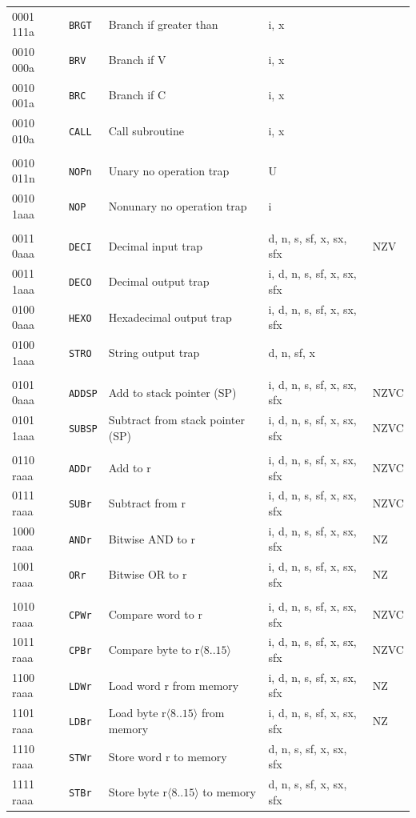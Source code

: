 \documentclass[10pt,fleqn]{book}
\begin{document}
\begin{tabular}{ l l l l l }
0001 111a   & \verb|BRGT|    & Branch if greater than               & i, x \\ 
0010 000a   & \verb|BRV|     & Branch if V                          & i, x \\ 
0010 001a   & \verb|BRC|     & Branch if C                          & i, x \\ 
0010 010a   & \verb|CALL|    & Call subroutine                      & i, x \\ 
 \\
0010 011n   & \verb|NOPn|    & Unary no operation trap              & U \\
0010 1aaa   & \verb|NOP|     & Nonunary no operation trap           & i \\
 \\
0011 0aaa   & \verb|DECI|    & Decimal input trap                   & d, n, s, sf, x, sx, sfx    & NZV \\
0011 1aaa   & \verb|DECO|    & Decimal output trap                  & i, d, n, s, sf, x, sx, sfx \\
0100 0aaa   & \verb|HEXO|    & Hexadecimal output trap              & i, d, n, s, sf, x, sx, sfx \\
0100 1aaa   & \verb|STRO|    & String output trap                   & d, n, sf, x \\
 \\
0101 0aaa   & \verb|ADDSP|   & Add to stack pointer (SP)            & i, d, n, s, sf, x, sx, sfx  & NZVC \\
0101 1aaa   & \verb|SUBSP|   & Subtract from stack pointer (SP)     & i, d, n, s, sf, x, sx, sfx  & NZVC \\
 \\
0110 raaa   & \verb|ADDr|    & Add to r                             & i, d, n, s, sf, x, sx, sfx  & NZVC \\
0111 raaa   & \verb|SUBr|    & Subtract from r                      & i, d, n, s, sf, x, sx, sfx  & NZVC \\
1000 raaa   & \verb|ANDr|    & Bitwise AND to r                     & i, d, n, s, sf, x, sx, sfx  & NZ \\
1001 raaa   & \verb|ORr|     & Bitwise OR to r                      & i, d, n, s, sf, x, sx, sfx  & NZ \\
 \\
1010 raaa   & \verb|CPWr|    & Compare word to r                    & i, d, n, s, sf, x, sx, sfx  & NZVC \\
1011 raaa   & \verb|CPBr|    & Compare byte to r$\langle8..15\rangle$ & i, d, n, s, sf, x, sx, sfx  & NZVC \\
1100 raaa   & \verb|LDWr|    & Load word r from memory              & i, d, n, s, sf, x, sx, sfx  & NZ \\
1101 raaa   & \verb|LDBr|    & Load byte r$\langle8..15\rangle$ from memory & i, d, n, s, sf, x, sx, sfx  & NZ \\
1110 raaa   & \verb|STWr|    & Store word r to memory               & d, n, s, sf, x, sx, sfx \\
1111 raaa   & \verb|STBr|    & Store byte r$\langle8..15\rangle$ to memory & d, n, s, sf, x, sx, sfx \\
\bottomrule
\end{tabular}
\end{document}
